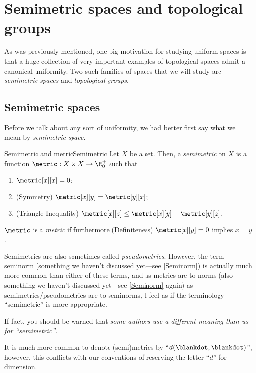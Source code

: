 \section{Semimetric spaces and topological groups}

As was previously mentioned, one big motivation for studying uniform spaces is that a huge collection of very important examples of topological spaces admit a canonical uniformity.  Two such families of spaces that we will study are \emph{semimetric spaces} and \emph{topological groups}.

\subsection{Semimetric spaces}

Before we talk about any sort of uniformity, we had better first say what we mean by \emph{semimetric space}.
\begin{dfn}{Semimetric and metric}{Semimetric}
Let $X$ be a set.  Then, a \emph{semimetric} on $X$ is a function $\metric:X\times X\rightarrow \R _0^+$ such that
\begin{enumerate}
\item $\metric[x][x]=0$;
\item (Symmetry) $\metric[x][y]=\metric[y][x]$;
\item (Triangle Inequality) $\metric[x][z]\leq \metric[x][y]+\metric[y][z]$.
\end{enumerate}
$\metric$ is a \emph{metric} if furthermore (Definiteness) $\metric[x][y]=0$ implies $x=y$.
\begin{rmk}
Semimetrics are also sometimes called \emph{pseudometrics}.  However, the term seminorm (something we haven't discussed yet---see \cref{Seminorm}) is actually much more common than either of these terms, and as metrics are to norms (also something we haven't discussed yet---see \cref{Seminorm} again) as semimetrics/pseudometrics are to seminorms, I feel as if the terminology ``semimetric'' is more appropriate.

If fact, you should be warned that \emph{some authors use a different meaning than us for ``semimetric''}.
\end{rmk}
\begin{rmk}
It is much more common to denote (semi)metrics by ``$d(\blankdot ,\blankdot )$'', however, this conflicts with our conventions of reserving the letter ``$d$'' for dimension.
\end{rmk}
\end{dfn}

